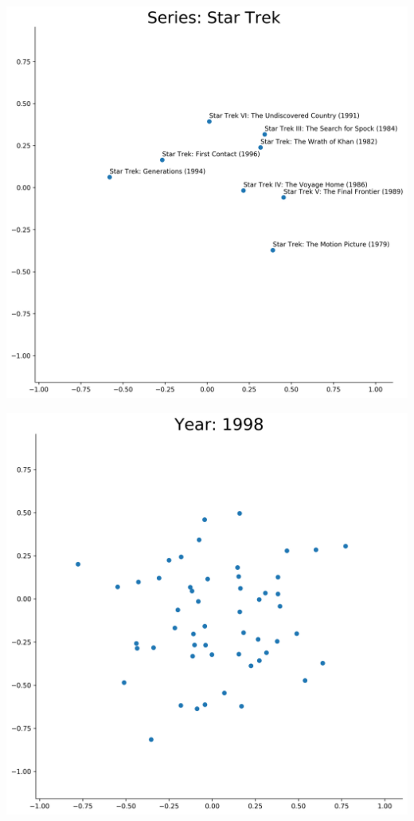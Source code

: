 \begin{appendices}
\begin{center}
\begin{minipage}{0.48\linewidth}
\end{minipage}
\begin{minipage}{0.48\linewidth}
\includegraphics[scale=0.35]{"Series: Star Trek"}
\end{minipage}
\hfill %
\begin{minipage}{0.48\linewidth}
\includegraphics[scale=0.35]{"Year: 1998"}
\end{minipage}
\end{center}


\end{appendices}
